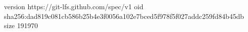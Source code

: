 version https://git-lfs.github.com/spec/v1
oid sha256:dad819c081cb586b25b4e3f0056a102e7bced5f978f5f027addc259fd84b45db
size 191970
